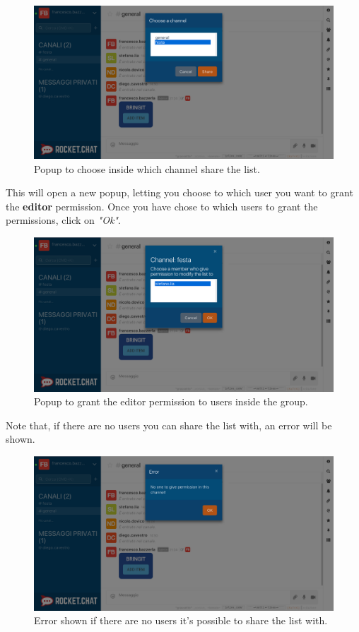 \begin{figure}[H]
  \centering 
  \includegraphics[width=\textwidth]{Sections/3-HowToUse/Images/share_group_channel.png}
  \caption{Popup to choose inside which channel share the list.}
\end{figure}

This will open a new popup, letting you choose to which user you want to grant the \textbf{editor} permission. Once you have chose to which users to grant the permissions, click on \textit{"Ok"}.

\begin{figure}[H]
  \centering 
  \includegraphics[width=\textwidth]{Sections/3-HowToUse/Images/share_group_user.png}
  \caption{Popup to grant the editor permission to users inside the group.}
\end{figure}

Note that, if there are no users you can share the list with, an error will be shown.

\begin{figure}[H]
  \centering 
  \includegraphics[width=\textwidth]{Sections/3-HowToUse/Images/popup_permission_give_error.png}
  \caption{Error shown if there are no users it's possible to share the list with.}
\end{figure}

